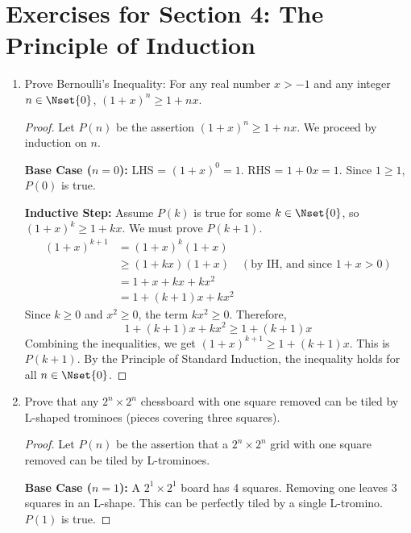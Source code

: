 \section*{Exercises for Section 4: The Principle of Induction}
\begin{enumerate}
    \item {} Prove Bernoulli's Inequality: For any real number $x > -1$ and any integer $n \in \Nset{0}$, $(1+x)^n \ge 1+nx$.
    \begin{proof}
    Let $P(n)$ be the assertion $(1+x)^n \ge 1+nx$. We proceed by induction on $n$.
    
    \textbf{Base Case ($n=0$):}
    LHS = $(1+x)^0 = 1$. RHS = $1+0x = 1$. Since $1 \ge 1$, $P(0)$ is true.
    
    \textbf{Inductive Step:}
    Assume $P(k)$ is true for some $k \in \Nset{0}$, so $(1+x)^k \ge 1+kx$. We must prove $P(k+1)$.
    \begin{align*}
        (1+x)^{k+1} &= (1+x)^k (1+x) \\
        &\ge (1+kx)(1+x) \quad (\text{by IH, and since } 1+x > 0) \\
        &= 1 + x + kx + kx^2 \\
        &= 1 + (k+1)x + kx^2
    \end{align*}
    Since $k \ge 0$ and $x^2 \ge 0$, the term $kx^2 \ge 0$. Therefore,
    $$ 1 + (k+1)x + kx^2 \ge 1 + (k+1)x $$
    Combining the inequalities, we get $(1+x)^{k+1} \ge 1+(k+1)x$. This is $P(k+1)$.
    By the Principle of Standard Induction, the inequality holds for all $n \in \Nset{0}$.
    \end{proof}
    
    \item {} Prove that any $2^n \times 2^n$ chessboard with one square removed can be tiled by L-shaped trominoes (pieces covering three squares).
    \begin{proof}
    Let $P(n)$ be the assertion that a $2^n \times 2^n$ grid with one square removed can be tiled by L-trominoes.
    
    \textbf{Base Case ($n=1$):}
    A $2^1 \times 2^1$ board has 4 squares. Removing one leaves 3 squares in an L-shape. This can be perfectly tiled by a single L-tromino. $P(1)$ is true.
    

\end{proof}
\end{enumerate}

